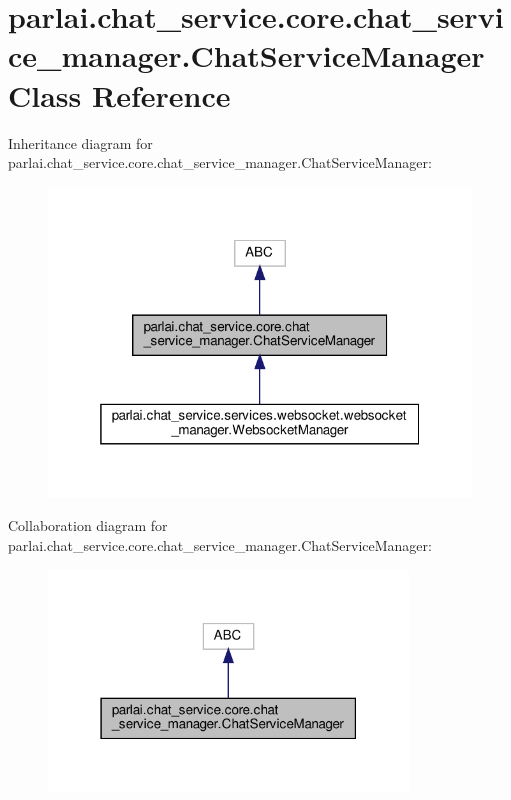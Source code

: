 \hypertarget{classparlai_1_1chat__service_1_1core_1_1chat__service__manager_1_1ChatServiceManager}{}\section{parlai.\+chat\+\_\+service.\+core.\+chat\+\_\+service\+\_\+manager.\+Chat\+Service\+Manager Class Reference}
\label{classparlai_1_1chat__service_1_1core_1_1chat__service__manager_1_1ChatServiceManager}


Inheritance diagram for parlai.\+chat\+\_\+service.\+core.\+chat\+\_\+service\+\_\+manager.\+Chat\+Service\+Manager\+:
\nopagebreak
\begin{figure}[H]
\begin{center}
\leavevmode
\includegraphics[width=319pt]{classparlai_1_1chat__service_1_1core_1_1chat__service__manager_1_1ChatServiceManager__inherit__graph}
\end{center}
\end{figure}


Collaboration diagram for parlai.\+chat\+\_\+service.\+core.\+chat\+\_\+service\+\_\+manager.\+Chat\+Service\+Manager\+:
\nopagebreak
\begin{figure}[H]
\begin{center}
\leavevmode
\includegraphics[width=271pt]{classparlai_1_1chat__service_1_1core_1_1chat__service__manager_1_1ChatServiceManager__coll__graph}
\end{center}
\end{figure}
